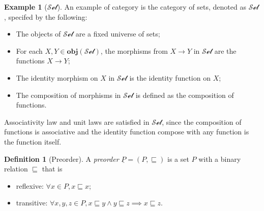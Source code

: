 \documentclass[12pt,twoside,a4paper]{report}
\theoremstyle{definition}
\newtheorem{definition}{Definition}
\theoremstyle{definition}
\theoremstyle{definition}
\newtheorem{example}{Example}
\theoremstyle{definition}
\begin{document}
        \begin{example}[$\mathcal{Set}$]
            An example of category is the category of sets, denoted as $\mathcal{Set}$, specifed by the following:
            \begin{itemize}
                \item 
                    The objects of $\mathcal{Set}$ are a fixed universe of sets;
                \item
                    For each $X, Y \in \textbf{obj}(\mathcal{Set})$, the morphisms from $X \to Y$ in $\mathcal{Set}$ are the functions $X \to Y$;
                \item
                    The identity morphism on $X$ in $\mathcal{Set}$ is the identity function on $X$;
                \item
                    The composition of morphisms in $\mathcal{Set}$ is defined as the composition of functions.
            \end{itemize}
            Associativity law and unit laws are satisfied in $\mathcal{Set}$, since the composition of functions is associative and the identity function compose with any function is the function itself.
        \end{example}

        \begin{definition}[Preorder]
            A \emph{preorder} $\underline{P} = (P, \sqsubseteq)$ is a set $P$ with a binary relation $\sqsubseteq$ that is
            \begin{itemize}
                \item reflexive: $\forall x \in P, x \sqsubseteq x$;
                \item transitive: $\forall x, y, z \in P, x \sqsubseteq y \land y \sqsubseteq z \implies x \sqsubseteq z$.
            \end{itemize}
        \end{definition}
\end{document}
